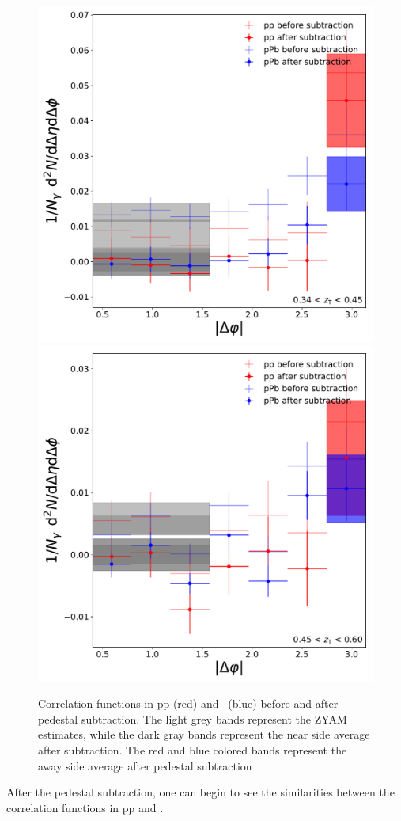 \begin{figure}
  \includegraphics[width = 0.24 \textwidth]{G-H_New/Befor_After_UE_pp-pPb_pT_0_zT_6.pdf}
  \includegraphics[width = 0.24 \textwidth]{G-H_New/Befor_After_UE_pp-pPb_pT_0_zT_7.pdf}
  \caption{Correlation functions in pp (red) and \pPb~(blue) before and after pedestal subtraction. The light grey bands represent the ZYAM estimates, while the dark gray bands represent the near side average after subtraction. The red and blue colored bands represent the away side average after pedestal subtraction}
  \label{fig:BF_UE_zT_second}
\end{figure}

After the pedestal subtraction, one can begin to see the similarities between the correlation functions in pp and \pPb.

\FloatBarrier

